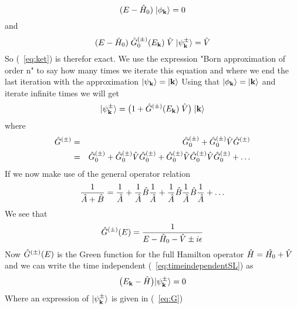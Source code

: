 \begin{equation} 
(E-\hat{H}_0)\;|\phi_{\bf k}\rangle=0
\end{equation}
%                                                 
and
%                                                 
\begin{equation}
(E-\hat{H}_0)\;\hat{G}^{(\pm)}_0(E_{\bf k})\;\hat{V}\;|\psi_{\bf k}^{\pm}\rangle=\hat{V}
\end{equation}
%                                                 
%                                                 
So (~\ref{eq:ket}) is therefor exact.  
We use the expression "Born approximation of order n" to say how many
times we iterate this equation and where we end the last iteration with the approximation
$|\psi_{\bf k}\rangle=|\bf k\rangle$ Using that $|\phi_{\bf k}\rangle=|\bf k\rangle$
and iterate infinite times we will get
%                                                 
\begin{equation}\label{eq:G}
\ket{\psi_{\bf k}^{\pm}}=\big(1+\op{G}^{(\pm)}(E_{\bf k})\;\op{V}\big)\;\ket{\bf k}
\end{equation}
%                                                 
where
%                                                 
\begin{eqnarray}\label{eq:GG}
\op{G}^{(\pm)} &=& \op{G}^{(\pm)}_{0}+\op{G}^{(\pm)}_{0}\op{V}\op{G}^{(\pm)} \nonumber\\
&=&
\op{G}^{(\pm)}_{0}+\op{G}^{(\pm)}_{0}\op{V}\op{G}^{(\pm)}_{0}
+\op{G}^{(\pm)}_{0}\op{V}\op{G}^{(\pm)}_{0}\op{V}\op{G}^{(\pm)}_{0}+\ldots
\end{eqnarray}
%                                                 
If we now make use of the general operator relation
%                                                 
\begin{equation}
\frac{1}{\hat{A}+\hat{B}}=\frac{1}{\hat{A}}+\frac{1}{\hat{A}}\hat{B}\frac{1}{\hat{A}}+\frac{1}{\hat{A}}\hat{B}
\frac{1}{\hat{A}}\hat{B}\frac{1}{\hat{A}}+\ldots
\end{equation}
%                                                 
We see that
%                                                 
\begin{equation}
\hat{G}^{(\pm)}(E)=\frac{1}{E-\hat{H}_0-\hat{V}\pm i\epsilon}
\end{equation}
%                                                 
Now $\hat{G}^{(\pm)}(E)$ is the Green function for the full Hamilton operator 
$\hat{H}=\hat{H_0}+\hat{V}$ and we can write the time independent {\SE} 
(~\ref{eq:timeindependentSL}) as
%                                                 
\begin{equation}
\big(E_{\bf k}-\hat{H}\big)|\psi_{\bf k}^{\pm}\rangle=0
\end{equation}
%                                                 
Where an expression of $|\psi_{\bf k}^{\pm}\rangle$ is given in (~\ref{eq:G})







